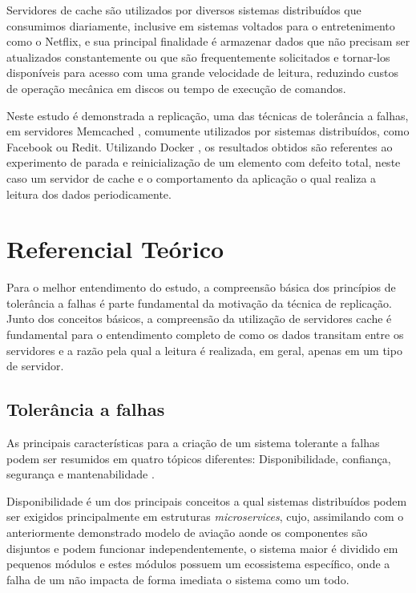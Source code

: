 \documentclass[conference]{IEEEtran}
\begin{document}
Servidores de cache são utilizados por diversos sistemas distribuídos que consumimos diariamente, inclusive em sistemas voltados para o entretenimento como o Netflix, e sua principal finalidade é armazenar dados que não precisam ser atualizados constantemente ou que são frequentemente solicitados e tornar-los disponíveis para acesso com uma grande velocidade de leitura, reduzindo custos de operação mecânica em discos ou tempo de execução de comandos.

Neste estudo é demonstrada a replicação, uma das técnicas de tolerância a falhas, em servidores Memcached \cite{memcached}, comumente utilizados por sistemas distribuídos, como Facebook ou Redit. Utilizando Docker \cite{docker}, os resultados obtidos são referentes ao experimento de parada e reinicialização de um elemento com defeito total, neste caso um servidor de cache e o comportamento da aplicação o qual realiza a leitura dos dados periodicamente.

\section{Referencial Teórico}

Para o melhor entendimento do estudo, a compreensão básica dos princípios de tolerância a falhas é parte fundamental da motivação da técnica de replicação. Junto dos conceitos básicos, a compreensão da utilização de servidores cache é fundamental para o entendimento completo de como os dados transitam entre os servidores e a razão pela qual a leitura é realizada, em geral, apenas em um tipo de servidor.

\subsection{Tolerância a falhas}

As principais características para a criação de um sistema tolerante a falhas podem ser resumidos em quatro tópicos diferentes: Disponibilidade, confiança, segurança e mantenabilidade \cite{Tanenbaum:2006:DSP:1202502}.

Disponibilidade é um dos principais conceitos a qual sistemas distribuídos podem ser exigidos principalmente em estruturas \textit{microservices}, cujo, assimilando com o anteriormente demonstrado modelo de aviação aonde os componentes são disjuntos e podem funcionar independentemente, o sistema maior é dividido em pequenos módulos e estes módulos possuem um ecossistema específico, onde a falha de um não impacta de forma imediata o sistema como um todo. 
\end{document}
